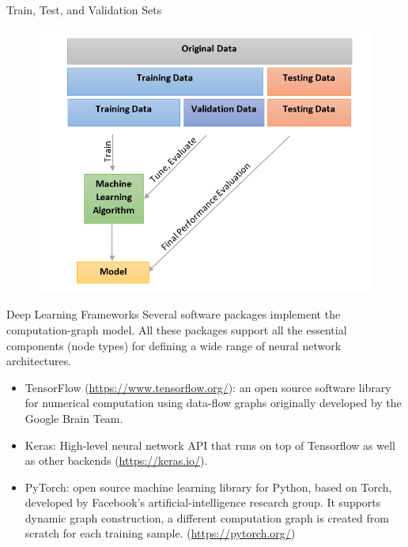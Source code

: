 \documentclass[handout]{beamer}
\begin{document}
\begin{frame}{Train, Test, and Validation Sets}
\begin{scriptsize}

 \begin{figure}[htb]
	\centering
	 \includegraphics[scale=0.55]{pics/validation.png}
\end{figure}


\end{scriptsize}
\end{frame}



\begin{frame}{Deep Learning Frameworks}
Several software packages implement the computation-graph model. All these packages support all the essential components (node types) for defining a wide range of neural network architectures.
\begin{scriptsize}
\begin{itemize}
\item TensorFlow (\url{https://www.tensorflow.org/}): an open source software library for numerical computation using data-flow graphs originally developed by the Google Brain Team. 

\item Keras: High-level neural network API that runs on top of Tensorflow as well as other backends (\url{https://keras.io/}). 

\item PyTorch: open source machine learning library for Python, based on Torch, developed by Facebook's artificial-intelligence research group. It supports dynamic graph construction, a different computation graph is created from scratch for each training sample. (\url{https://pytorch.org/})


\end{itemize}
\end{scriptsize}
\end{frame}
\end{document}
